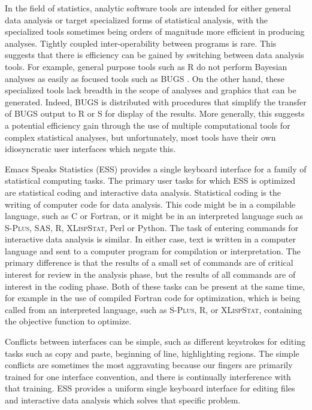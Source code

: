 \documentclass{article}
\newcommand*{\Splus}{\textsc{S-Plus}}
\newcommand*{\XLispStat}{\textsc{XLispStat}}
\begin{document}
In the field of statistics, analytic software tools are intended for
either general data analysis or target specialized forms of
statistical analysis, with the specialized tools sometimes being
orders of magnitude more efficient in producing analyses.  Tightly
coupled inter-operability between programs is rare.  This suggests
that there is efficiency can be gained by switching between data
analysis tools.  For example, general purpose tools such as R
\citep{ihak:gent:1996} do not perform Bayesian analyses as easily as
focused tools such as BUGS \citep{SpieThomBest:1999}.  On the other
hand, these specialized tools lack breadth in the scope of analyses
and graphics that can be generated.  Indeed, BUGS is distributed with
procedures that simplify the transfer of BUGS output to R or S for
display of the results.  More generally, this suggests a potential
efficiency gain through the use of multiple computational tools for
complex statistical analyses, but unfortunately, most tools have their
own idiosyncratic user interfaces which negate this.

Emacs Speaks Statistics (ESS) provides a single keyboard interface for
a family of statistical computing tasks.  The primary user tasks for
which ESS is optimized are statistical coding and interactive data
analysis.  Statistical coding is the writing of computer code for data
analysis.  This code might be in a compilable language, such as C or
Fortran, or it might be in an interpreted language such as \Splus,
SAS, R, \XLispStat, Perl or Python.  The task of entering commands for
interactive data analysis is similar.  In either case, text is written
in a computer language and sent to a computer program for compilation
or interpretation.  The primary difference is that the results of a
small set of commands are of critical interest for review in the
analysis phase, but the results of all commands are of interest in the
coding phase.  Both of these tasks can be present at the same time,
for example in the use of compiled Fortran code for optimization,
which is being called from an interpreted language, such as \Splus, R,
or \XLispStat, containing the objective function to optimize.

Conflicts between interfaces can be simple, such as different
keystrokes for editing tasks such as copy and paste, beginning of
line, highlighting regions.  The simple conflicts are sometimes the
most aggravating because our fingers are primarily trained for one
interface convention, and there is continually interference with that
training.  ESS provides a uniform single keyboard interface for
editing files and interactive data analysis which solves that specific
problem.
\end{document}
